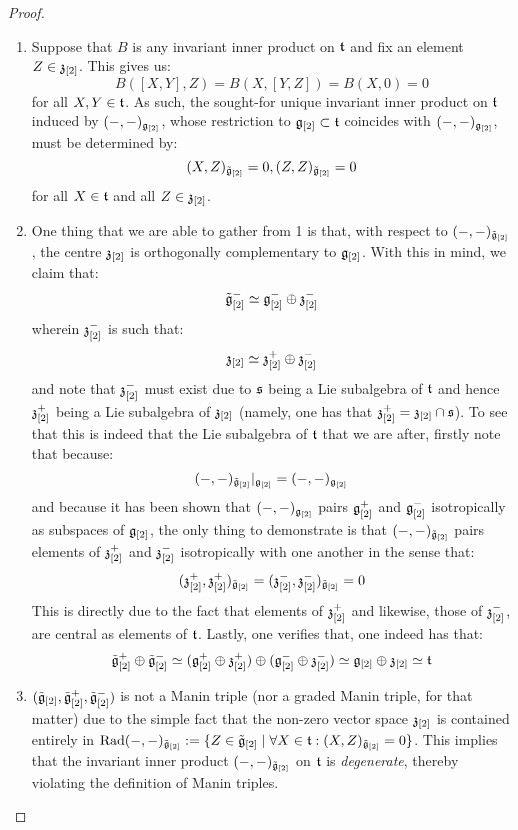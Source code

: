                 \begin{proof}
                    \begin{enumerate}
                        \item Suppose that $B$ is any invariant inner product on $\mathfrak{t}$ and fix an element $Z \in \mathfrak{z}_{[2]}$. This gives us:
                            $$B([X, Y], Z) = B(X, [Y, Z]) = B(X, 0) = 0$$
                        for all $X, Y \in \mathfrak{t}$. As such, the sought-for unique invariant inner product on $\mathfrak{t}$ induced by $(-, -)_{\mathfrak{g}_{[2]}}$, whose restriction to $\mathfrak{g}_{[2]} \subset \mathfrak{t}$ coincides with $(-, -)_{\mathfrak{g}_{[2]}}$, must be determined by:
                            $$(X, Z)_{\tilde{\mathfrak{g}}_{[2]}} = 0, (Z, Z)_{\tilde{\mathfrak{g}}_{[2]}} = 0$$
                        for all $X \in \mathfrak{t}$ and all $Z \in \mathfrak{z}_{[2]}$.
                        \item One thing that we are able to gather from 1 is that, with respect to $(-, -)_{\tilde{\mathfrak{g}}_{[2]}}$, the centre $\mathfrak{z}_{[2]}$ is orthogonally complementary to $\mathfrak{g}_{[2]}$. With this in mind, we claim that:
                            $$\tilde{\mathfrak{g}}_{[2]}^- \simeq \mathfrak{g}_{[2]}^- \oplus \mathfrak{z}_{[2]}^-$$
                        wherein $\mathfrak{z}_{[2]}^-$ is such that:
                            $$\mathfrak{z}_{[2]} \simeq \mathfrak{z}_{[2]}^+ \oplus \mathfrak{z}_{[2]}^-$$
                        and note that $\mathfrak{z}_{[2]}^-$ must exist due to $\mathfrak{s}$ being a Lie subalgebra of $\mathfrak{t}$ and hence $\mathfrak{z}_{[2]}^+$ being a Lie subalgebra of $\mathfrak{z}_{[2]}$ (namely, one has that $\mathfrak{z}_{[2]}^+ = \mathfrak{z}_{[2]} \cap \mathfrak{s}$). To see that this is indeed that the Lie subalgebra of $\mathfrak{t}$ that we are after, firstly note that because:
                            $$(-, -)_{\tilde{\mathfrak{g}}_{[2]}}|_{\mathfrak{g}_{[2]}} = (-, -)_{\mathfrak{g}_{[2]}}$$
                        and because it has been shown that $(-, -)_{\mathfrak{g}_{[2]}}$ pairs $\mathfrak{g}_{[2]}^+$ and $\mathfrak{g}_{[2]}^-$ isotropically as subspaces of $\mathfrak{g}_{[2]}$, the only thing to demonstrate is that $(-, -)_{\tilde{\mathfrak{g}}_{[2]}}$ pairs elements of $\mathfrak{z}_{[2]}^+$ and $\mathfrak{z}_{[2]}^-$ isotropically with one another in the sense that:
                            $$(\mathfrak{z}_{[2]}^+, \mathfrak{z}_{[2]}^+)_{\tilde{\mathfrak{g}}_{[2]}} = (\mathfrak{z}_{[2]}^-, \mathfrak{z}_{[2]}^-)_{\tilde{\mathfrak{g}}_{[2]}} = 0$$
                        This is directly due to the fact that elements of $\mathfrak{z}_{[2]}^+$ and likewise, those of $\mathfrak{z}_{[2]}^-$, are central as elements of $\mathfrak{t}$. Lastly, one verifies that, one indeed has that:
                            $$\tilde{\mathfrak{g}}_{[2]}^+\oplus \tilde{\mathfrak{g}}_{[2]}^- \simeq ( \mathfrak{g}_{[2]}^+ \oplus \mathfrak{z}_{[2]}^+ ) \oplus ( \mathfrak{g}_{[2]}^- \oplus \mathfrak{z}_{[2]}^- ) \simeq \mathfrak{g}_{[2]} \oplus \mathfrak{z}_{[2]} \simeq \mathfrak{t}$$
                        \item $(\tilde{\mathfrak{g}}_{[2]}, \tilde{\mathfrak{g}}_{[2]}^+, \tilde{\mathfrak{g}}_{[2]}^-)$ is not a Manin triple (nor a graded Manin triple, for that matter) due to the simple fact that the non-zero vector space $\mathfrak{z}_{[2]}$ is contained entirely in $\operatorname{Rad} (-, -)_{\tilde{\mathfrak{g}}_{[2]}} := \{Z \in \tilde{\mathfrak{g}}_{[2]}\mid \forall X \in \mathfrak{t}: (X, Z)_{\tilde{\mathfrak{g}}_{[2]}} = 0\}$. This implies that the invariant inner product $(-, -)_{\tilde{\mathfrak{g}}_{[2]}}$ on $\mathfrak{t}$ is \textit{degenerate}, thereby violating the definition of Manin triples. 


\end{enumerate}
\end{proof}
